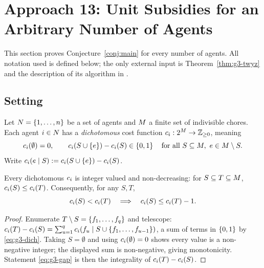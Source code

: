 \section{Approach 13: Unit Subsidies for an Arbitrary Number of Agents}
\label{sec:approach13}

This section proves Conjecture~\ref{conj:main} for every number of agents.
All notation used is defined below; the only external input is
Theorem~\ref{thm:g3-twyz} and the description of its algorithm in
.

\subsection{Setting}
\label{sec:g3-setting}

Let $N = \left\{1,\dots,n\right\}$ be a set of agents and $M$ a finite set
of indivisible chores. Each agent $i \in N$ has a \emph{dichotomous}
cost function $c_i : 2^{M} \to \mathbb{Z}_{\ge 0}$, meaning
\begin{equation}
\label{eq:g3-dich}
  c_i(\emptyset) = 0,
  \qquad
  c_i(S \cup \left\{e\right\}) - c_i(S) \in \left\{0,1\right\}
  \quad\text{for all } S \subseteq M,\ e \in M \setminus S .
\end{equation}
Write $c_i(e \mid S) := c_i(S \cup \left\{e\right\}) - c_i(S)$.

\begin{observation}
\label{obs:g3-basic}
Every dichotomous $c_i$ is integer valued and non-decreasing: for
$S \subseteq T \subseteq M$, $c_i(S) \le c_i(T)$. Consequently,
for any $S,T$,
\begin{equation}
\label{eq:g3-gap}
  c_i(S) < c_i(T) \quad\Longrightarrow\quad c_i(S) \le c_i(T) - 1 .
\end{equation}
\end{observation}
\begin{proof}
Enumerate $T \setminus S = \left\{f_1,\dots,f_q\right\}$ and telescope: $c_i(T) -
c_i(S) = \sum_{u=1}^{q} c_i(f_u \mid S \cup \left\{f_1,\dots,f_{u-1}\right\})$,
a sum of terms in $\left\{0,1\right\}$ by \eqref{eq:g3-dich}. Taking $S = \emptyset$
and using $c_i(\emptyset)=0$ shows every value is a non-negative integer;
the displayed sum is non-negative, giving monotonicity. Statement
\eqref{eq:g3-gap} is then the integrality of $c_i(T) - c_i(S)$.
\end{proof}

